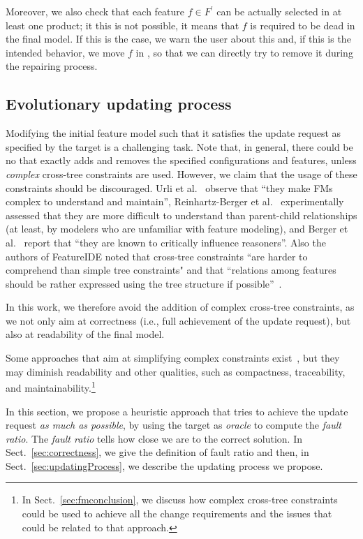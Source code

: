 \begin{tikzborder}{\cite{Gargantini16:validation}}
\begin{tikzborder}{\cite{gargantini_combinatorial_2017}}
\begin{tikzborder}{\cite{garn2019}}
\begin{tikzborder}{\cite{arcaini2019achieving}}
	Moreover, we also check that each feature $f \in F^\prime$ can be actually selected in at least one product; it this is not possible, it means that $f$ is required to be dead in the final model. If this is the case, we warn the user about this and, if this is the intended behavior, we move $f$ in \Frem, so that we can directly try to remove it during the repairing process.\be
	
	\subsection{Evolutionary updating process}\label{sec:process}
	
	\bb Modifying the initial feature model \initFm such that it satisfies the update request as specified by the target is a challenging task. Note that, in general, there could be no \fmp that exactly adds and removes the specified configurations and features, unless {\it complex} cross-tree constraints are used. However, we claim that the usage of these constraints should be discouraged. Urli et al.~\cite{visualSupport} observe that ``they make FMs complex to understand and maintain'', Reinhartz-Berger et al.~\cite{ComprehendingFeatureModels} experimentally assessed that they are more difficult to understand than parent-child relationships (at least, by modelers who are unfamiliar with feature modeling), and Berger et al.~\cite{Berger2013} report that ``they are known to critically influence reasoners''. Also the authors of FeatureIDE noted that cross-tree constraints ``are harder to comprehend than simple tree constraints" and that ``relations among features should be rather expressed using the tree structure if possible''~\cite{FeatureIDEbook}. 
	\be
	
	In this work, we therefore avoid the addition of complex cross-tree constraints, as we not only aim at correctness (i.e., full achievement of the update request), but also at readability of the final model.
	
	Some approaches that aim at simplifying complex constraints exist~\cite{knuppel_is_2017,vonRhein2015}, but they may diminish readability and other qualities, such as compactness, traceability, and maintainability.\footnote{In Sect.~\ref{sec:fmconclusion}, we discuss how complex cross-tree constraints could be used to achieve all the change requirements and the issues that could be related to that approach.}
	
	In this section, we propose a heuristic approach that tries to achieve the update request {\it as much as possible}, by using the target as {\it oracle} to compute the {\it fault ratio}. The \textit{fault ratio} tells how close we are to the correct solution. In Sect.~\ref{sec:correctness}, we give the definition of fault ratio and then, in Sect.~\ref{sec:updatingProcess}, we describe the updating process we propose.%
	

\end{tikzborder}
\end{tikzborder}
\end{tikzborder}
\end{tikzborder}
